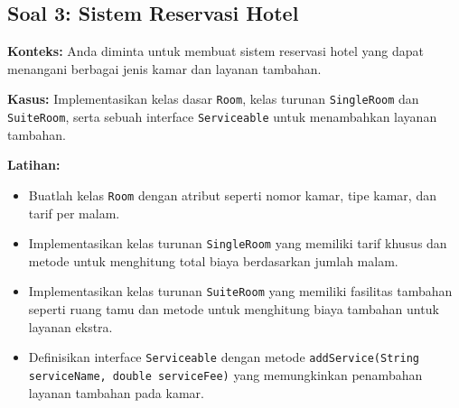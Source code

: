 \subsection{Soal 3: Sistem Reservasi Hotel}

\textbf{Konteks:} Anda diminta untuk membuat sistem reservasi hotel yang dapat menangani berbagai jenis kamar dan layanan tambahan.

\textbf{Kasus:} Implementasikan kelas dasar \texttt{Room}, kelas turunan \texttt{SingleRoom} dan \texttt{SuiteRoom}, serta sebuah interface \texttt{Serviceable} untuk menambahkan layanan tambahan.

\textbf{Latihan:}
\begin{itemize}
	\item Buatlah kelas \texttt{Room} dengan atribut seperti nomor kamar, tipe kamar, dan tarif per malam.
	\item Implementasikan kelas turunan \texttt{SingleRoom} yang memiliki tarif khusus dan metode untuk menghitung total biaya berdasarkan jumlah malam.
	\item Implementasikan kelas turunan \texttt{SuiteRoom} yang memiliki fasilitas tambahan seperti ruang tamu dan metode untuk menghitung biaya tambahan untuk layanan ekstra.
	\item Definisikan interface \texttt{Serviceable} dengan metode \texttt{addService(String serviceName, double serviceFee)} yang memungkinkan penambahan layanan tambahan pada kamar.
\end{itemize}

